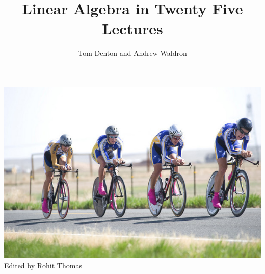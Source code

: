 \documentclass[12pt]{article}
\newcommand{\1}{{\mathrm 1\hspace*{-0.4ex}%
\rule{0.1ex}{1.52ex}\hspace*{0.2ex}}}
\begin{document}
\title{Linear Algebra in Twenty Five Lectures}

\author{Tom Denton and Andrew Waldron}


\maketitle

\begin{center}
\includegraphics[scale=.6]{bikes.jpg}\\[8mm]
 {Edited by Rohit Thomas}
\end{center}

\newpage

\tableofcontents


\newpage






































\end{document}
